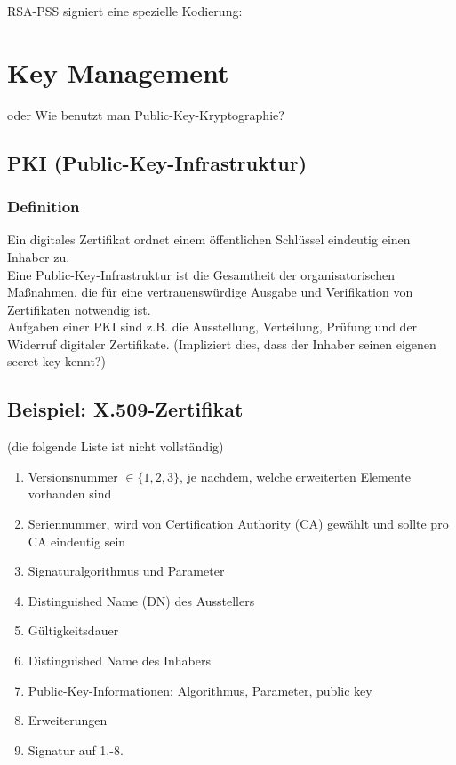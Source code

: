 \documentclass[a4paper,twoside,DIV15,BCOR12mm]{scrbook}
\begin{document}
RSA-PSS signiert eine spezielle Kodierung:\\



\chapter{Key Management}

oder Wie benutzt man Public-Key-Kryptographie?

\section{PKI (Public-Key-Infrastruktur)}

\subsection{\glqq Definition\grqq}

Ein digitales Zertifikat ordnet einem öffentlichen Schlüssel eindeutig einen Inhaber zu.\\ Eine Public-Key-Infrastruktur ist die Gesamtheit der organisatorischen Maßnahmen, die für eine vertrauenswürdige Ausgabe und Verifikation von Zertifikaten notwendig ist.\\

Aufgaben einer PKI sind z.B. die Ausstellung, Verteilung, Prüfung und der Widerruf digitaler Zertifikate. (Impliziert dies, dass der Inhaber seinen eigenen secret key kennt?)

\section{Beispiel: X.509-Zertifikat}

(die folgende Liste ist nicht vollständig)

\begin{enumerate}
	\item Versionsnummer $\in \{1,2,3\}$, je nachdem, welche erweiterten Elemente vorhanden sind
	\item Seriennummer, wird von Certification Authority (CA) gewählt und sollte pro CA eindeutig sein
	\item Signaturalgorithmus und Parameter
	\item Distinguished Name (DN) des Ausstellers
	\item Gültigkeitsdauer
	\item Distinguished Name des Inhabers
	\item Public-Key-Informationen: Algorithmus, Parameter, public key
	\item Erweiterungen
	\item Signatur auf 1.-8.
\end{enumerate}
\end{document}
